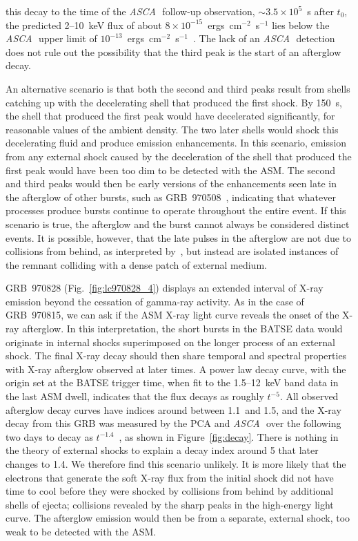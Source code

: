 \documentclass{aastex}
\def\asca{{\it ASCA\,}}
\begin{document}
\begin{multicols}{2}

\noindent
this decay to the time of the \asca~follow-up observation,
$\sim3.5\times10^5$~s after $t_0$, the predicted 2--10~keV flux of
about $8\times10^{-15}$~ergs~cm$^{-2}$~s$^{-1}$ lies below the
\asca~upper limit of
$10^{-13}$~ergs~cm$^{-2}$~s$^{-1}$~\citep{muify97}.  The lack of an
\asca~detection does not rule out the possibility that the third peak
is the start of an afterglow decay.

An alternative scenario is that both the second and third peaks result
from shells catching up with the decelerating shell that produced the
first shock.  By 150~s, the shell that produced the first peak would
have decelerated significantly, for reasonable values of the ambient
density.  The two later shells would shock this decelerating fluid and
produce emission enhancements.  In this scenario, emission from any
external shock caused by the deceleration of the shell that produced
the first peak would have been too dim to be detected with the ASM.
The second and third peaks would then be early versions of the
enhancements seen late in the afterglow of other bursts, such as
GRB~970508~\citep{paabc98}, indicating that whatever processes produce
bursts continue to operate throughout the entire event.  If this
scenario is true, the afterglow and the burst cannot always be
considered distinct events.  It is possible, however, that the late
pulses in the afterglow are not due to collisions from behind, as
interpreted by~\citet{paabc98}, but instead are isolated instances of
the remnant colliding with a dense patch of external medium.

GRB~970828 (Fig.~\ref{fig:lc970828_4}) displays an extended interval
of X-ray emission beyond the cessation of gamma-ray activity.  As in
the case of GRB~970815, we can ask if the ASM X-ray light curve
reveals the onset of the X-ray afterglow.  In this interpretation, the
short bursts in the BATSE data would originate in internal shocks
superimposed on the longer process of an external shock.  The final
X-ray decay should then share temporal and spectral properties with
X-ray afterglow observed at later times.  A power law decay curve,
with the origin set at the BATSE trigger time, when fit to the
1.5--12~keV band data in the last ASM dwell, indicates that the flux
decays as roughly $t^{-5}$.  All observed afterglow decay curves have
indices around between 1.1~and 1.5, and the X-ray decay from this GRB
was measured by the PCA and \asca~over the following two days to decay
as $t^{-1.4}$~\citep{muykm97}, as shown in Figure~\ref{fig:decay}.
There is nothing in the theory of external shocks to explain a decay
index around 5 that later changes to 1.4.  We therefore find this
scenario unlikely.  It is more likely that the electrons that generate
the soft X-ray flux from the initial shock did not have time to cool
before they were shocked by collisions from behind by additional
shells of ejecta; collisions revealed by the sharp peaks in the
high-energy light curve.  The afterglow emission would then be from a
separate, external shock, too weak to be detected with the ASM.


\end{multicols}
\end{document}
